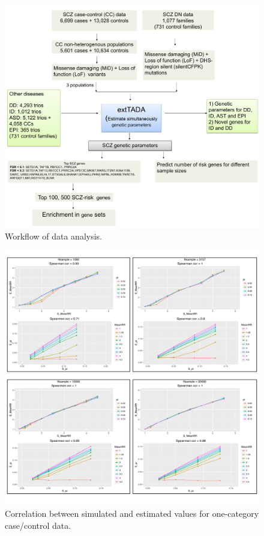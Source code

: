 \documentclass[]{article}
\begin{document}
\begin{figure}[H]
\includegraphics[width=\textwidth,height=\textwidth]{Picture/wholeDataAnalysis.pdf}
\caption{Workflow of data analysis.}
\label{fig:wholedataAnalysis}
\end{figure}



\begin{figure}[H]
\includegraphics[width=\textwidth,height=\textwidth]{Picture/SimulationOnlyCC.pdf}
\caption{Correlation between simulated and estimated values for
  one-category case/control data.}
\label{fig:CCsimulatedDataDetailed}
\end{figure}
\end{document}
